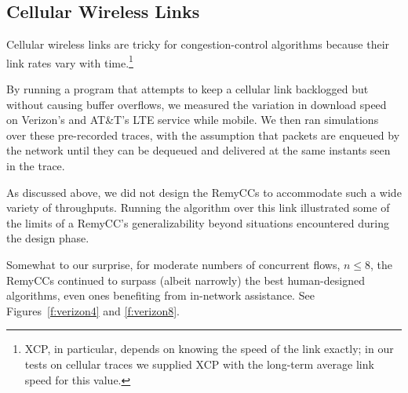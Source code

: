\subsection{Cellular Wireless Links}

Cellular wireless links are tricky for congestion-control algorithms
because their link rates vary with time.\footnote{XCP, in particular,
  depends on knowing the speed of the link exactly; in our tests on cellular
  traces we supplied XCP with the long-term average link speed for
  this value.}

By running a program that attempts to keep a cellular link backlogged
but without causing buffer overflows, we measured the variation in
download speed on Verizon's and AT\&T's LTE service while mobile. We
then ran simulations over these pre-recorded traces, with the
assumption that packets are enqueued by the network until they can be
dequeued and delivered at the same instants seen in the trace.

%
%
%
%

As discussed above, we did not design the RemyCCs to accommodate such a wide
variety of throughputs. Running the algorithm over this link
illustrated some of the limits of a RemyCC's generalizability beyond
situations encountered during the design phase.

Somewhat to our surprise, for moderate numbers of concurrent flows, $n
\le 8$, the RemyCCs continued to surpass (albeit narrowly) the best
human-designed algorithms, even ones benefiting from in-network
assistance. See Figures~\ref{f:verizon4} and \ref{f:verizon8}.



